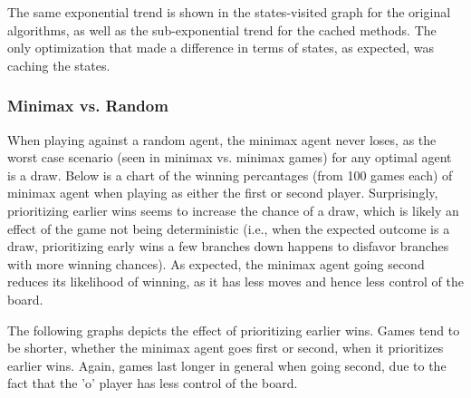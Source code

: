 The same exponential trend is shown in the states-visited graph for the original algorithms, as well as the sub-exponential trend for the cached methods. The only optimization that made a difference in terms of states, as expected, was caching the states.

\subsubsection{Minimax vs. Random}

When playing against a random agent, the minimax agent never loses, as the worst case scenario (seen in minimax vs. minimax games) for any optimal agent is a draw. Below is a chart of the winning percantages (from 100 games each) of minimax agent when playing as either the first or second player. Surprisingly, prioritizing earlier wins seems to increase the chance of a draw, which is likely an effect of the game not being deterministic (i.e., when the expected outcome is a draw, prioritizing early wins a few branches down happens to disfavor branches with more winning chances). As expected, the minimax agent going second reduces its likelihood of winning, as it has less moves and hence less control of the board.
\begin{center}

\end{center}

The following graphs depicts the effect of prioritizing earlier wins. Games tend to be shorter, whether the minimax agent goes first or second, when it prioritizes earlier wins. Again, games last longer in general when going second, due to the fact that the 'o' player has less control of the board.

